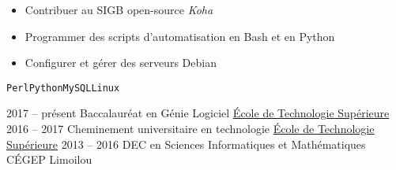 \documentclass[9pt]{developercv} %
\begin{document}
\begin{minipage}[t]{0.8\textwidth}
\begin{entrylist}
		{
			\vspace{-14pt}
			\begin{itemize}
				\renewcommand{\labelitemi}{\raisebox{.45ex}{\rule{.6ex}{.6ex}}}
				\setlength\itemsep{-1pt}
				\item Contribuer au SIGB open-source \emph{Koha}
				\item Programmer des scripts d'automatisation en Bash et en Python
				\item Configurer et gérer des serveurs Debian
			\end{itemize}
			\vspace{-4pt}
			\texttt{Perl}\slashsep\texttt{Python}\slashsep\texttt{MySQL}\slashsep\texttt{Linux}
		}
\end{entrylist}



\begin{entrylist}
	\entry
		{2017 -- présent}
		{Baccalauréat en Génie Logiciel}
		{\href{https://etsmtl.ca}{École de Technologie Supérieure}}
		{\vspace{-14pt}}
	\entry
		{2016 -- 2017}
		{Cheminement universitaire en technologie}
		{\href{https://etsmtl.ca}{École de Technologie Supérieure}}
		{\vspace{-14pt}}
	\entry
		{2013 -- 2016}
		{DEC en Sciences Informatiques et Mathématiques}
		{CÉGEP Limoilou}
		{\vspace{-14pt}}
\end{entrylist}




\end{minipage}
\end{document}
